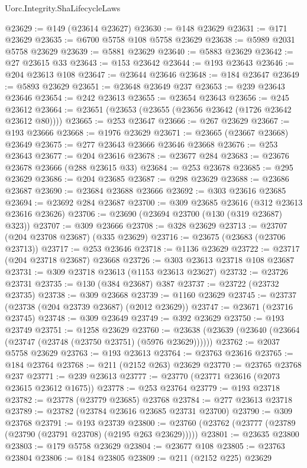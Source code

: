 \begin{lexlean}{Uorc.Integrity.ShaLifecycleLaws}
\begin{coremodule}
@23629 := @149 (@23614 @23627)
@23630 := @148 @23629
@23631 := @171 @23629
@23635 := @6700 @5758 @108 @5758 @23629
@23638 := @5989 @2031 @5758 @23629
@23639 := @5881 @23629
@23640 := @5883 @23629
@23642 := @27 @23615 @33
@23643 := @153 @23642
@23644 := @193 @23643
@23646 := @204 @23613 @108
@23647 := @23644 @23646
@23648 := @184 @23647
@23649 := @5893 @23629
@23651 := @23648 @23649 @237
@23653 := @239 @23643 @23646
@23654 := @242 @23613
@23655 := @23654 @23643
@23656 := @245 @23612
@23664 := @23651 (@23653 (@23655 (@23656 @23642 (@1726 @23642 @23612 @80))))
@23665 := @253 @23647
@23666 := @267 @23629
@23667 := @193 @23666
@23668 := @1976 @23629
@23671 := @23665 (@23667 @23668) @23649
@23675 := @277 @23643 @23666 @23646 @23668
@23676 := @253 @23643
@23677 := @204 @23616
@23678 := @23677 @284
@23683 := @23676 @23678 @23666 (@288 @23615 @33)
@23684 := @253 @23678
@23685 := @295 @23629
@23686 := @204 @23685
@23687 := @298 @23629
@23688 := @23686 @23687
@23690 := @23684 @23688 @23666
@23692 := @303 @23616 @23685
@23694 := @23692 @284 @23687
@23700 := @309 @23685 @23616 (@312 @23613 @23616 @23626)
@23706 := @23690 (@23694 @23700 (@130 (@319 @23687) @323))
@23707 := @309 @23666
@23708 := @328 @23629
@23713 := @23707 (@204 @23708 @23687) (@335 @23629)
@23716 := @23675 (@23683 (@23706 @23713))
@23717 := @253 @23646
@23718 := @1136 @23629
@23722 := @23717 (@204 @23718 @23687) @23668
@23726 := @303 @23613 @23718 @108 @23687
@23731 := @309 @23718 @23613 (@1153 @23613 @23627)
@23732 := @23726 @23731
@23735 := @130 (@384 @23687) @387
@23737 := @23722 (@23732 @23735)
@23738 := @309 @23668
@23739 := @1160 @23629
@23745 := @23737 (@23738 (@204 @23739 @23687) (@2012 @23629))
@23747 := @23671 (@23716 @23745)
@23748 := @309 @23649
@23749 := @392 @23629
@23750 := @193 @23749
@23751 := @1258 @23629
@23760 := @23638 (@23639 (@23640 (@23664 (@23747 (@23748 (@23750 @23751) (@5976 @23629))))))
@23762 := @2037 @5758 @23629
@23763 := @193 @23613
@23764 := @23763 @23616
@23765 := @184 @23764
@23768 := @211 (@2152 @263) @23629
@23770 := @23765 @23768 @237
@23771 := @239 @23613
@23777 := @23770 (@23771 @23616 (@2073 @23615 @23612 @1675))
@23778 := @253 @23764
@23779 := @193 @23718
@23782 := @23778 (@23779 @23685) @23768
@23784 := @277 @23613 @23718
@23789 := @23782 (@23784 @23616 @23685 @23731 @23700)
@23790 := @309 @23768
@23791 := @193 @23739
@23800 := @23760 (@23762 (@23777 (@23789 (@23790 (@23791 @23708) (@2195 @263 @23629)))))
@23801 := @23635 @23800
@23803 := @179 @5758 @23629
@23804 := @23677 @108
@23805 := @23763 @23804
@23806 := @184 @23805
@23809 := @211 (@2152 @225) @23629

\end{coremodule}
\end{lexlean}
